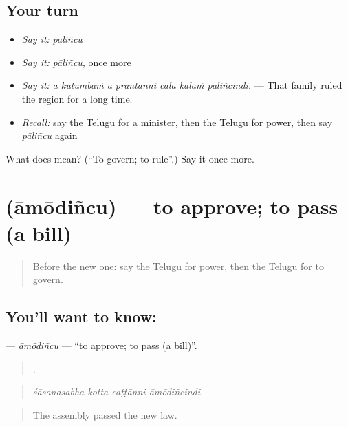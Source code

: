 \subsection*{Your turn}
\begin{itemize}
\raggedright
  \item \emph{Say it:} \emph{pāliñcu}
  \item \emph{Say it:} \emph{pāliñcu}, once more
  \item \emph{Say it:} \emph{ā kuṭumbaṁ ā prāntānni cālā kālaṁ pāliñcindi.} — That family ruled the region for a long time.
  \item \emph{Recall:} say the Telugu for a minister, then the Telugu for power, then say \emph{pāliñcu} again
\end{itemize}

\begin{tcolorbox}[breakable,colback=teal!4,colframe=teal!35!black,title={Before you move on}]
What does  mean? (\textquotedblleft{}To govern; to rule\textquotedblright{}.) Say it once more.
\end{tcolorbox}
\section[\texorpdfstring{\te{ఆమోదించు} (āmōdiñcu)}{ఆమోదించు (āmōdiñcu)}]{ (āmōdiñcu) — to approve; to pass (a bill)}

\label{lesson:TE-C402-amodincu}



\begin{quote}
Before the new one: say the Telugu for power, then the Telugu for to govern.
\end{quote}

\subsection*{You'll want to know: }
\textbf{} — \emph{āmōdiñcu} — \textquotedblleft{}to approve; to pass (a bill)\textquotedblright{}.

\begin{quote}
   .
\end{quote}

\begin{quote}
\emph{śāsanasabha kotta caṭṭānni āmōdiñcindi.}
\end{quote}

\begin{quote}
The assembly passed the new law.
\end{quote}

